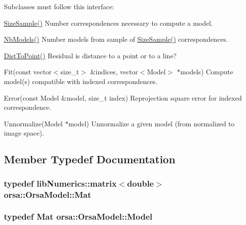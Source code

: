 Subclasses must follow this interface\+:
\begin{DoxyEnumerate}
\item \hyperlink{classorsa_1_1OrsaModel_a3d2e0a09f6ddc02c3b9ee85a1ceb1ee7}{Size\+Sample()} Number correspondences necessary to compute a model.
\item \hyperlink{classorsa_1_1OrsaModel_a4567e2e9a7d39e2bcbbc9af9e9d9ddc7}{Nb\+Models()} Number models from sample of \hyperlink{classorsa_1_1OrsaModel_a3d2e0a09f6ddc02c3b9ee85a1ceb1ee7}{Size\+Sample()} correspondences.
\item \hyperlink{classorsa_1_1OrsaModel_abf92fafced441e3458792629e0054b37}{Dist\+To\+Point()} Residual is distance to a point or to a line?
\item Fit(const vector$<$size\+\_\+t$>$ \&indices, vector$<$\+Model$>$ $\ast$models) Compute model(s) compatible with indexed correspondences.
\item Error(const Model \&model, size\+\_\+t index) Reprojection square error for indexed correspondence.
\item Unnormalize(\+Model $\ast$model) Unnormalize a given model (from normalized to image space). 
\end{DoxyEnumerate}

\subsection{Member Typedef Documentation}
\hypertarget{classorsa_1_1OrsaModel_a522135c09871e55e3757780cc1ce57f5}{}
\subsubsection[{Mat}]{\setlength{\rightskip}{0pt plus 5cm}typedef {\bf lib\+Numerics\+::matrix}$<$double$>$ {\bf orsa\+::\+Orsa\+Model\+::\+Mat}}\label{classorsa_1_1OrsaModel_a522135c09871e55e3757780cc1ce57f5}
\hypertarget{classorsa_1_1OrsaModel_aadc7e7fc0708ca6bc623e75cdc66b5e8}{}
\subsubsection[{Model}]{\setlength{\rightskip}{0pt plus 5cm}typedef {\bf Mat} {\bf orsa\+::\+Orsa\+Model\+::\+Model}}\label{classorsa_1_1OrsaModel_aadc7e7fc0708ca6bc623e75cdc66b5e8}
\hypertarget{classorsa_1_1OrsaModel_a3e690ba72d88880cc9d7074350c09104}{}
